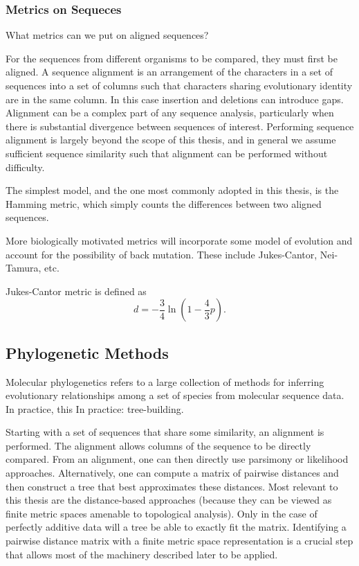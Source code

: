 \subsubsection{Metrics on Sequeces}


What metrics can we put on aligned sequences?

For the sequences from different organisms to be compared, they must first be aligned.
A sequence alignment is an arrangement of the characters in a set of sequences into a set of columns such that characters sharing evolutionary identity are in the same column.
In this case insertion and deletions can introduce gaps.
Alignment can be a complex part of any sequence analysis, particularly when there is substantial divergence between sequences of interest.
Performing sequence alignment is largely beyond the scope of this thesis, and in general we assume sufficient sequence similarity such that alignment can be performed without difficulty.

The simplest model, and the one most commonly adopted in this thesis, is the Hamming metric, which simply counts the differences between two aligned sequences.

More biologically motivated metrics will incorporate some model of evolution and account for the possibility of back mutation.
These include Jukes-Cantor, Nei-Tamura, etc.

Jukes-Cantor metric is defined as 
\begin{equation}
d=-\frac{3}{4}\ln(1-\frac{4}{3}p).
\end{equation}

\subsection{Phylogenetic Methods}

Molecular phylogenetics refers to a large collection of methods for inferring evolutionary relationships among a set of species from molecular sequence data.
In practice, this 
In practice: tree-building.

Starting with a set of sequences that share some similarity, an alignment is performed.
The alignment allows columns of the sequence to be directly compared.
From an alignment, one can then directly use parsimony or likelihood approaches.
Alternatively, one can compute a matrix of pairwise distances and then construct a tree that best approximates these distances.
Most relevant to this thesis are the distance-based approaches (because they can be viewed as finite metric spaces amenable to topological analysis).
Only in the case of perfectly additive data will a tree be able to exactly fit the matrix.
Identifying a pairwise distance matrix with a finite metric space representation is a crucial step that allows most of the machinery described later to be applied.

